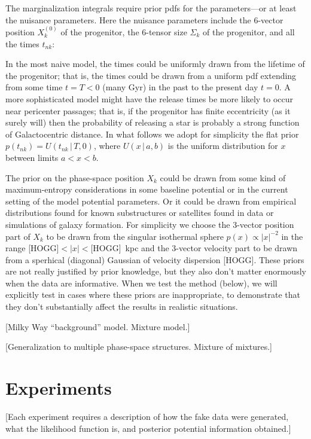 \documentclass[letterpaper,12pt,preprint]{aastex}
\newcommand{\given}{\,|\,}
\begin{document}
The marginalization integrals require prior pdfs for the
parameters---or at least the nuisance parameters.  Here the nuisance
parameters include the 6-vector position $X_k^{(0)}$ of the
progenitor, the 6-tensor size $\Sigma_k$ of the progenitor, and all
the times $t_{nk}$:

In the most naive model, the times could be uniformly drawn from the
lifetime of the progenitor; that is, the times could be drawn from a
uniform pdf extending from some time $t=T<0$ (many Gyr) in the past to
the present day $t=0$.  A more sophisticated model might have the
release times be more likely to occur near pericenter passages; that
is, if the progenitor has finite eccentricity (as it surely will) then
the probability of releasing a star is probably a strong function of
Galactocentric distance.  In what follows we adopt for simplicity the
flat prior $p(t_{nk})=U(t_{nk}\given T,0)$, where $U(x\given a,b)$ is
the uniform distribution for $x$ between limits $a<x<b$.

The prior on the phase-space position $X_k$ could be drawn from some
kind of maximum-entropy considerations in some baseline potential or
in the current setting of the model potential parameters.  Or it could
be drawn from empirical distributions found for known substructures or
satellites found in data or simulations of galaxy formation.  For
simplicity we choose the 3-vector position part of $X_k$ to be drawn
from the singular isothermal sphere $p(x)\propto |x|^{-2}$ in the
range [HOGG]$<|x|<$[HOGG]~kpc and the 3-vector velocity part to be
drawn from a sperhical (diagonal) Gaussian of velocity dispersion
[HOGG].  These priors are not really justified by prior knowledge, but
they also don't matter enormously when the data are informative.  When
we test the method (below), we will explicitly test in cases where
these priors are inappropriate, to demonstrate that they don't
substantially affect the results in realistic situations.

[Milky Way ``background'' model.  Mixture model.]

[Generalization to multiple phase-space structures. Mixture of
  mixtures.]

\section{Experiments}

[Each experiment requires a description of how the fake data were
  generated, what the likelihood function is, and posterior potential
  information obtained.]
\end{document}

